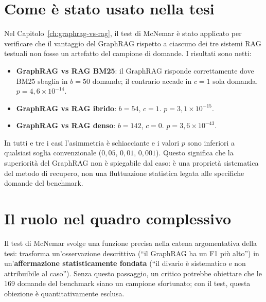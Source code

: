 \documentclass[11pt,a4paper]{report}
\begin{document}
\section{Come è stato usato nella tesi}

Nel Capitolo~\ref{ch:graphrag-vs-rag}, il test di McNemar è stato applicato
per verificare che il vantaggio del GraphRAG rispetto a ciascuno dei tre
sistemi RAG testuali non fosse un artefatto del campione di domande. I
risultati sono netti:

\begin{itemize}
  \item \textbf{GraphRAG vs RAG BM25}: il GraphRAG risponde correttamente
        dove BM25 sbaglia in $b = 50$ domande; il contrario accade in
        $c = 1$ sola domanda. $p = 4{,}6 \times 10^{-14}$.
  \item \textbf{GraphRAG vs RAG ibrido}: $b = 54$, $c = 1$.
        $p = 3{,}1 \times 10^{-15}$.
  \item \textbf{GraphRAG vs RAG denso}: $b = 142$, $c = 0$.
        $p = 3{,}6 \times 10^{-43}$.
\end{itemize}

In tutti e tre i casi l'asimmetria è schiacciante e i valori $p$ sono
inferiori a qualsiasi soglia convenzionale ($0{,}05$, $0{,}01$, $0{,}001$).
Questo significa che la superiorità del GraphRAG non è spiegabile dal caso:
è una proprietà sistematica del metodo di recupero, non una fluttuazione
statistica legata alle specifiche domande del benchmark.

\section{Il ruolo nel quadro complessivo}

Il test di McNemar svolge una funzione precisa nella catena argomentativa
della tesi: trasforma un'osservazione descrittiva (``il GraphRAG ha un F1
più alto'') in un'\textbf{affermazione statisticamente fondata} (``il
divario è sistematico e non attribuibile al caso''). Senza questo
passaggio, un critico potrebbe obiettare che le 169 domande del benchmark
siano un campione sfortunato; con il test, questa obiezione è
quantitativamente esclusa.
\end{document}
